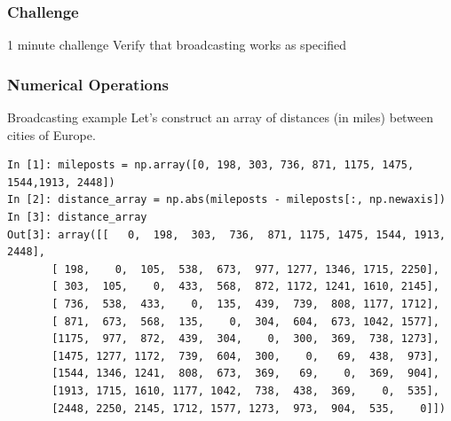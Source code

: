 \documentclass[colorlinks]{beamer}
\begin{document}
\begin{frame}[fragile]\frametitle{Challenge}
\begin{block}{1 minute challenge}
Verify that broadcasting works as specified
\end{block}

\end{frame}

\begin{frame}[fragile]\frametitle{Numerical Operations}
\begin{block}{Broadcasting example}
Let’s construct an array of distances (in miles) between cities of Europe.
\tiny
\begin{verbatim}
In [1]: mileposts = np.array([0, 198, 303, 736, 871, 1175, 1475, 1544,1913, 2448]) 
In [2]: distance_array = np.abs(mileposts - mileposts[:, np.newaxis]) 
In [3]: distance_array 
Out[3]: array([[   0,  198,  303,  736,  871, 1175, 1475, 1544, 1913, 2448],
       [ 198,    0,  105,  538,  673,  977, 1277, 1346, 1715, 2250],
       [ 303,  105,    0,  433,  568,  872, 1172, 1241, 1610, 2145],
       [ 736,  538,  433,    0,  135,  439,  739,  808, 1177, 1712],
       [ 871,  673,  568,  135,    0,  304,  604,  673, 1042, 1577],
       [1175,  977,  872,  439,  304,    0,  300,  369,  738, 1273],
       [1475, 1277, 1172,  739,  604,  300,    0,   69,  438,  973],
       [1544, 1346, 1241,  808,  673,  369,   69,    0,  369,  904],
       [1913, 1715, 1610, 1177, 1042,  738,  438,  369,    0,  535],
       [2448, 2250, 2145, 1712, 1577, 1273,  973,  904,  535,    0]])

\end{verbatim}


\end{block}

\end{frame}
\end{document}
